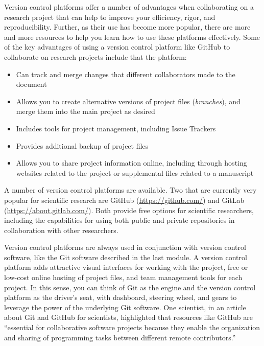 \documentclass[]{tufte-book}
\providecommand{\tightlist}{%
  \setlength{\itemsep}{0pt}\setlength{\parskip}{0pt}}
\begin{document}
Version control platforms offer a number of advantages when collaborating on a
research project that can help to improve your efficiency, rigor, and
reproducibility. Further, as their use has become more popular, there are more
and more resources to help you learn how to use these platforms effectively.
Some of the key advantages of using a version control platform like GitHub to
collaborate on research projects include that the platform:

\begin{itemize}
\tightlist
\item
  Can track and merge changes that different collaborators made to the
  document
\item
  Allows you to create alternative versions of project files (\emph{branches}), and merge them into the main project as desired
\item
  Includes tools for project management, including Issue Trackers
\item
  Provides additional backup of project files
\item
  Allows you to share project information online, including through hosting websites related to the project or supplemental files related to a manuscript
\end{itemize}

A number of version control platforms are available. Two that are currently very
popular for scientific research are GitHub (\url{https://github.com/}) and GitLab
(\url{https://about.gitlab.com/}). Both provide free options for scientific
researchers, including the capabilities for using both public and private
repositories in collaboration with other researchers.

Version control platforms are always used in conjunction with version control
software, like the Git software described in the last module. A version control
platform adds attractive visual interfaces for working with the project, free or
low-cost online hosting of project files, and team management tools for each
project. In this sense, you can think of Git as the engine and the version
control platform as the driver's seat, with dashboard, steering wheel, and gears
to leverage the power of the underlying Git software. One scientist, in an
article about Git and GitHub for scientists, highlighted that resources like
GitHub are ``essential for collaborative software projects because they enable
the organization and sharing of programming tasks between different remote
contributors.'' \citep{perez2016ten}
\end{document}
